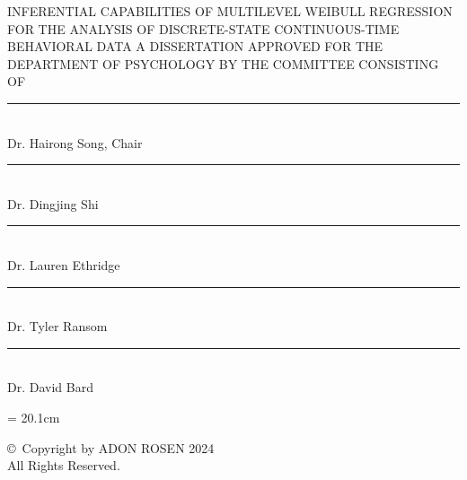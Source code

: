 \documentclass[12pt]{./styles/outhesis}
\begin{document}
\newpage
\thispagestyle{empty}
\begin{center}
\msp
INFERENTIAL CAPABILITIES OF MULTILEVEL WEIBULL REGRESSION 
FOR THE ANALYSIS OF DISCRETE-STATE CONTINUOUS-TIME BEHAVIORAL DATA
\linebreak[1]
\linebreak[1]
\linebreak[1]
\linebreak[1]
A DISSERTATION APPROVED FOR THE\\
DEPARTMENT OF PSYCHOLOGY
\linebreak[1]
\linebreak[1]
\linebreak[1]
\linebreak[1]
\linebreak[1]
\linebreak[1]
\linebreak[1]
\linebreak[1]
BY THE COMMITTEE CONSISTING OF
\linebreak[1]
\linebreak[1]
\end{center}
\begin{flushright}
\rule{6.5cm}{0.02em}\\
\vspace{-0.15in}
    Dr. Hairong Song, Chair\\
\vspace{0.2in}
\rule{6.5cm}{0.02em}\\
\vspace{-0.15in}
       Dr. Dingjing Shi\\
\vspace{0.2in}
\rule{6.5cm}{0.02em}\\
\vspace{-0.15in}
  Dr. Lauren Ethridge\\
\vspace{0.2in}
\rule{6.5cm}{0.02em}\\
\vspace{-0.15in}
  Dr. Tyler Ransom\\
\vspace{0.2in}
\rule{6.5cm}{0.02em}\\
\vspace{-0.15in}
  Dr. David Bard

\end{flushright}
\newpage
\singlespace
\thispagestyle{empty}
\headsep = 20.1cm
\begin{center}
\copyright\ Copyright by ADON ROSEN 2024\\
All Rights Reserved.
\end{center}
\end{document}
